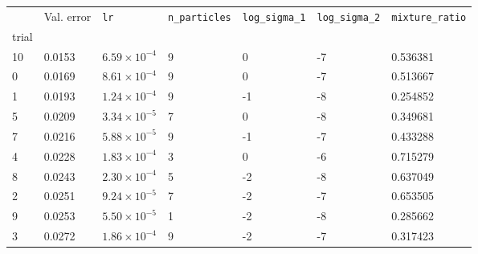 \begin{tabular}{lp{2.3cm}p{2.3cm}p{2.3cm}p{2.3cm}p{2.3cm}p{2.3cm}}
\toprule
{} &  Val. error &         \texttt{lr} &  \texttt{n\_particles} &  \texttt{log\_sigma\_1} &  \texttt{log\_sigma\_2} &  \texttt{mixture\_ratio} \\
trial &             &                     &                        &                         &                         &                          \\
\midrule
10    &      0.0153 & $6.59\times10^{-4}$ &                      9 &                       0 &                      -7 &                 0.536381 \\
0     &      0.0169 & $8.61\times10^{-4}$ &                      9 &                       0 &                      -7 &                 0.513667 \\
1     &      0.0193 & $1.24\times10^{-4}$ &                      9 &                      -1 &                      -8 &                 0.254852 \\
5     &      0.0209 & $3.34\times10^{-5}$ &                      7 &                       0 &                      -8 &                 0.349681 \\
7     &      0.0216 & $5.88\times10^{-5}$ &                      9 &                      -1 &                      -7 &                 0.433288 \\
4     &      0.0228 & $1.83\times10^{-4}$ &                      3 &                       0 &                      -6 &                 0.715279 \\
8     &      0.0243 & $2.30\times10^{-4}$ &                      5 &                      -2 &                      -8 &                 0.637049 \\
2     &      0.0251 & $9.24\times10^{-5}$ &                      7 &                      -2 &                      -7 &                 0.653505 \\
9     &      0.0253 & $5.50\times10^{-5}$ &                      1 &                      -2 &                      -8 &                 0.285662 \\
3     &      0.0272 & $1.86\times10^{-4}$ &                      9 &                      -2 &                      -7 &                 0.317423 \\
\bottomrule
\end{tabular}
